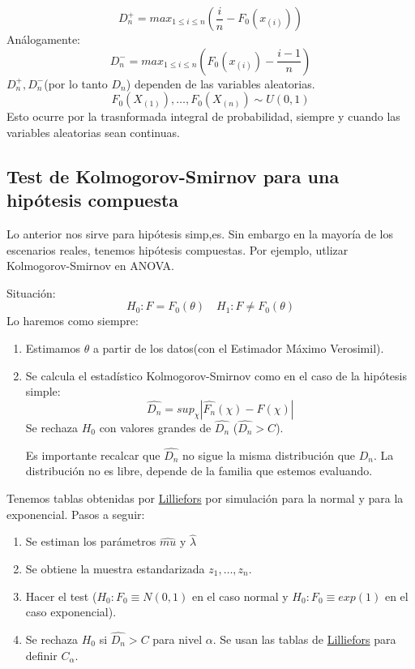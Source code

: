 \[
    D_n^+=max_{1 \leq i \leq n}\left(\frac{i}{n}-F_0(x_{(i)})\right)
\]
Análogamente:
\[
    D_n^-=max_{1 \leq i \leq n}\left(F_0(x_{(i)})-\frac{i-1}{n}\right)
\]
$D_n^+,D_n^-$(por lo tanto $D_n$) dependen de las variables aleatorias.
\[
F_0(X_{(1)}),\dots,F_0(X_{(n)}) \sim U(0,1)
\]
Esto ocurre por la trasnformada integral de probabilidad, siempre y cuando las variables aleatorias sean continuas.


\subsection{Test de Kolmogorov-Smirnov para una hipótesis compuesta}

Lo anterior nos sirve para hipótesis simp,es. Sin embargo en la mayoría de los escenarios reales, tenemos hipótesis compuestas.
Por ejemplo, utlizar Kolmogorov-Smirnov en ANOVA.

Situación:
\[
H_0: F=F_0(\theta) \quad H_1:F \neq F_0(\theta)
\]
Lo haremos como siempre:
\begin{enumerate}
    \item Estimamos $\theta$ a partir de los datos(con el Estimador Máximo Verosimil).
    \item Se calcula el estadístico Kolmogorov-Smirnov como en el caso de la hipótesis simple:
    \[
    \widehat{D_n}=sup_\chi|\widehat{F_n}(\chi)-F(\chi)|
    \]
    Se rechaza $H_0$ con valores grandes de $\widehat{D_n}$ ($\widehat{D_n}>C$). 
    
    Es importante recalcar que $\widehat{D_n}$ no sigue la misma distribución que $D_n$.
    La distribución no es libre, depende de la familia que estemos evaluando.
\end{enumerate}

Tenemos tablas obtenidas por \href{https://es.wikipedia.org/wiki/Prueba_de_Lilliefors}{Lilliefors}
por simulación para la normal y para la exponencial.
Pasos a seguir:
\begin{enumerate}
    \item Se estiman los parámetros $\widehat{mu}$ y $\widehat{\lambda}$
    \item Se obtiene la muestra estandarizada $z_1,\dots,z_n$.
    \item Hacer el test ($H_0:F_0 \equiv N(0,1)$ en el caso normal y $H_0:F_0\equiv exp(1)$ en el caso exponencial).
    \item Se rechaza $H_0$ si $\widehat{D_n}>C$ para nivel $\alpha$. Se usan las tablas de \href{https://es.wikipedia.org/wiki/Prueba_de_Lilliefors}{Lilliefors}
    para definir $C_\alpha$.
\end{enumerate}

